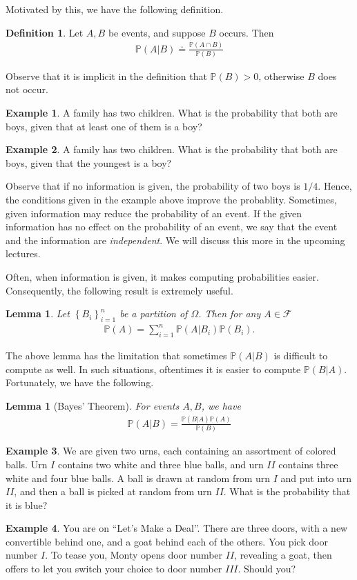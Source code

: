 \documentclass[12pt]{article}
\newcommand{\filter}{\mathcal{F}}
\newcommand{\prob}{\mathbb{P}}
\theoremstyle{plain}
\newtheorem{lemma}[theorem]{Lemma}
\theoremstyle{definition}
\newtheorem*{definition}{Definition}
\newtheorem*{example}{Example}
\theoremstyle{remark}
\numberwithin{equation}{section}  %
\begin{document}
Motivated by this, we have the following definition.
\begin{definition}
Let $A, B$ be events, and suppose $B$ occurs. Then
\begin{align*}
\prob(A | B) \doteq \frac{\prob(A \cap B)}{\prob(B)}
\end{align*}
\end{definition}
Observe that it is implicit in the definition that $\prob(B) > 0$, otherwise
$B$ does not occur.
\begin{example}
A family has two children. What is the probability that both are boys,
given that at least one of them is a boy?
\end{example}
\begin{example}
A family has two children. What is the probability that both are boys,
given that the youngest is a boy?
\end{example}
Observe that if no information is given, the probability of two boys is $1/4$.
Hence, the conditions given in the example above improve the probablity.
Sometimes, given information may reduce the probability of an event.
If the given information has no effect on the probability of an event,
we say that the event and the information are \emph{independent}. We will
discuss this more in the upcoming lectures.

Often, when information is given, it makes computing probabilities easier.
Consequently, the following result is extremely useful.
\begin{lemma}
Let $ \left\{ B_i \right\}_{i=1}^n$ be a partition of $\Omega$. Then
for any $A \in \filter$
\begin{align*}
\prob(A) = \sum_{i = 1}^n \prob(A | B_i) \prob(B_i).
\end{align*}
\end{lemma}
The above lemma has the limitation that sometimes $\prob(A |
B)$ is difficult to compute as well. In such situations, oftentimes
it is easier to compute $\prob(B | A)$. Fortunately, we have the following.
\begin{lemma}[Bayes' Theorem] For events $A, B$, we have
\begin{align*}
\prob(A | B) = \frac{\prob(B | A) \prob (A)}{\prob(B)}
\end{align*}
\end{lemma}
\begin{example}
We are given two urns, each containing an assortment of colored balls.
Urn $I$ contains two white and three blue balls, and urn $II$ contains
three white and four blue balls. A ball is drawn at random from urn $I$
and put into urn $II$, and then a ball is picked at random from urn $II$.
What is the probability that it is blue?
\end{example}
\begin{example}
You are on ``Let's Make a Deal''. There are three doors, with a new convertible
behind one, and a goat behind each of the others. You pick door number $I$.
To tease you, Monty opens door number $II$, revealing a goat, then offers to let
you switch your choice to door number $III$. Should you?
\end{example}
\end{document}
